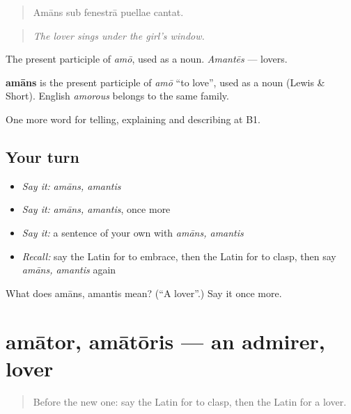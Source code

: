 \begin{quote}
Amāns sub fenestrā puellae cantat.
\end{quote}

\begin{quote}
\emph{The lover sings under the girl's window.}
\end{quote}

The present participle of \emph{amō}, used as a noun. \emph{Amantēs} — lovers.

\begin{cousinweb}
\textbf{amāns} is the present participle of \emph{amō} \textquotedblleft{}to love\textquotedblright{}, used as a noun (Lewis \& Short). English \emph{amorous} belongs to the same family.
\end{cousinweb}

\begin{grammarlens}[title={What you've built}]
One more word for telling, explaining and describing at B1.
\end{grammarlens}

\subsection*{Your turn}
\begin{itemize}
\raggedright
  \item \emph{Say it:} \emph{amāns, amantis}
  \item \emph{Say it:} \emph{amāns, amantis}, once more
  \item \emph{Say it:} a sentence of your own with \emph{amāns, amantis}
  \item \emph{Recall:} say the Latin for to embrace, then the Latin for to clasp, then say \emph{amāns, amantis} again
\end{itemize}

\begin{tcolorbox}[breakable,colback=teal!4,colframe=teal!35!black,title={Before you move on}]
What does amāns, amantis mean? (\textquotedblleft{}A lover\textquotedblright{}.) Say it once more.
\end{tcolorbox}
\section[amātor, amātōris]{amātor, amātōris — an admirer, lover}

\label{lesson:LA-C535-amator}



\begin{quote}
Before the new one: say the Latin for to clasp, then the Latin for a lover.
\end{quote}

